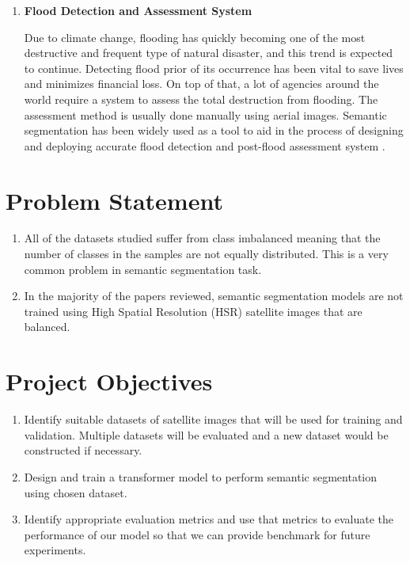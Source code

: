 \begin{enumerate}
    \item \textbf{Flood Detection and Assessment System}
    
    Due to climate change, flooding has quickly becoming one of the most destructive and frequent type of natural disaster, and this trend is expected to continue. Detecting flood prior of its occurrence has been vital to save lives and minimizes financial loss. On top of that, a lot of agencies around the world require a system to assess the total  destruction from flooding. The assessment method is usually done manually using aerial images. Semantic segmentation has been widely used as a tool to aid in the process of designing and deploying accurate flood detection and post-flood assessment system \cite{edseee.988427220220717}. 
\end{enumerate}

\section{Problem Statement}

\begin{enumerate}
    \item All of the datasets studied suffer from class imbalanced meaning that the number of classes in the samples are not equally distributed. This is a very common problem in semantic segmentation task.
    \item In the majority of the papers reviewed, semantic segmentation models are not trained using High Spatial Resolution (HSR) satellite images that are balanced.
\end{enumerate}


\section{Project Objectives}
\begin{enumerate}
    \item Identify suitable datasets of satellite images that will be used for training and validation. Multiple datasets will be evaluated and a new dataset would be constructed if necessary.
    \item Design and train a transformer model to perform semantic segmentation using chosen dataset.
    \item Identify appropriate evaluation metrics and use that metrics to evaluate the performance of our model so that we can provide benchmark for future experiments.
\end{enumerate}
